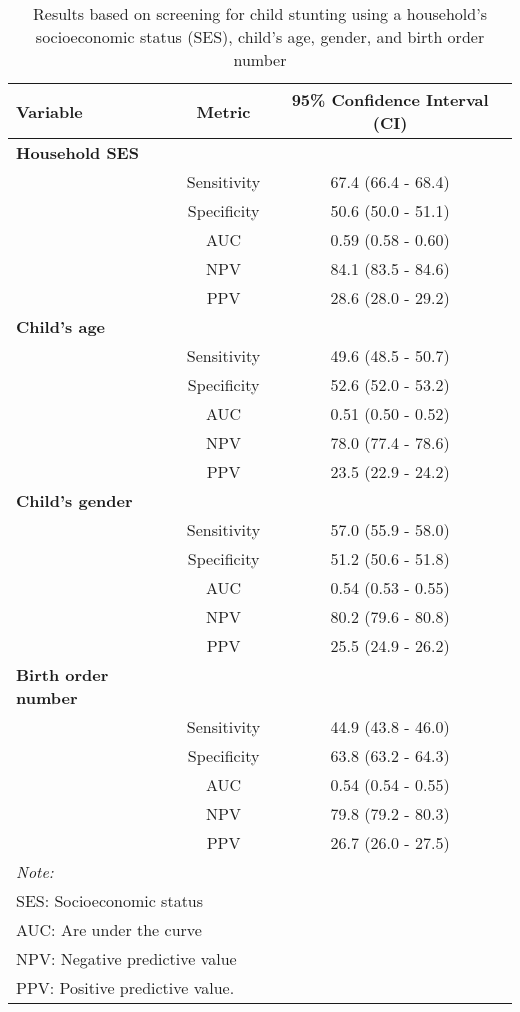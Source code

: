 \documentclass[sn-basic,Numbered,pdflatex]{sn-jnl}
\theoremstyle{remark}
\theoremstyle{definition}
\begin{document}
\begin{table}

\caption{\label{tab:sens}Results based on screening for child stunting using a household's socioeconomic status (SES), child's age, gender, and birth order number}
\centering
\begin{tabular}[t]{>{}lcc}
\toprule
\textbf{Variable} & \textbf{Metric} & \textbf{95\% Confidence Interval (CI)}\\
\midrule
\textbf{Household SES} &  & \\
\textbf{} & Sensitivity & 67.4 (66.4 - 68.4)\\
\textbf{} & Specificity & 50.6 (50.0 - 51.1)\\
\textbf{} & AUC & 0.59 (0.58 - 0.60)\\
\textbf{} & NPV & 84.1 (83.5 - 84.6)\\
\addlinespace
\textbf{} & PPV & 28.6 (28.0 - 29.2)\\
\textbf{Child's age} &  & \\
\textbf{} & Sensitivity & 49.6 (48.5 - 50.7)\\
\textbf{} & Specificity & 52.6 (52.0 - 53.2)\\
\textbf{} & AUC & 0.51 (0.50 - 0.52)\\
\addlinespace
\textbf{} & NPV & 78.0 (77.4 - 78.6)\\
\textbf{} & PPV & 23.5 (22.9 - 24.2)\\
\textbf{Child's gender} &  & \\
\textbf{} & Sensitivity & 57.0 (55.9 - 58.0)\\
\textbf{} & Specificity & 51.2 (50.6 - 51.8)\\
\addlinespace
\textbf{} & AUC & 0.54 (0.53 - 0.55)\\
\textbf{} & NPV & 80.2 (79.6 - 80.8)\\
\textbf{} & PPV & 25.5 (24.9 - 26.2)\\
\textbf{Birth order number} &  & \\
\textbf{} & Sensitivity & 44.9 (43.8 - 46.0)\\
\addlinespace
\textbf{} & Specificity & 63.8 (63.2 - 64.3)\\
\textbf{} & AUC & 0.54 (0.54 - 0.55)\\
\textbf{} & NPV & 79.8 (79.2 - 80.3)\\
\textbf{} & PPV & 26.7 (26.0 - 27.5)\\
\bottomrule
\multicolumn{3}{l}{\rule{0pt}{1em}\textit{Note: }}\\
\multicolumn{3}{l}{\rule{0pt}{1em}SES: Socioeconomic status}\\
\multicolumn{3}{l}{\rule{0pt}{1em}AUC: Are under the curve}\\
\multicolumn{3}{l}{\rule{0pt}{1em}NPV: Negative predictive value}\\
\multicolumn{3}{l}{\rule{0pt}{1em}PPV: Positive predictive value.}\\
\end{tabular}
\end{table}
\end{document}

